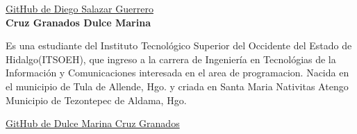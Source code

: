\documentclass[conference]{IEEEtran}
\begin{document}
  \href{https://github.com/diego2334577}{GitHub de Diego Salazar Guerrero}
\\

\textbf{Cruz Granados Dulce Marina}
  
 Es una estudiante del Instituto Tecnológico Superior del Occidente del Estado de Hidalgo(ITSOEH), que ingreso a la carrera de Ingeniería en Tecnológias de la Información y Comunicaciones interesada en el area de programacion. Nacida en el municipio de Tula de Allende, Hgo. y criada en Santa Maria Nativitas Atengo Municipio de  Tezontepec de Aldama, Hgo.
 
  \href{https://github.com/Dulcemcg}{GitHub de Dulce Marina Cruz Granados}
  \\
 
 
\end{document}
